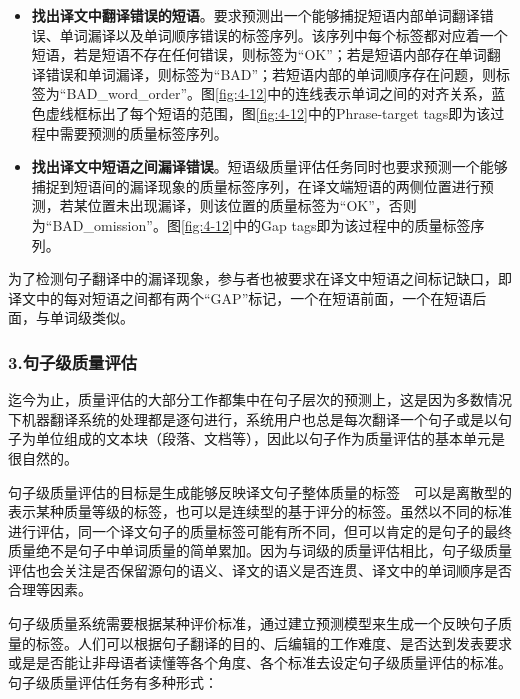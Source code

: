 \begin{itemize}
\vspace{0.5em}
\item {\small\sffamily\bfseries{找出译文中翻译错误的短语}}。要求预测出一个能够捕捉短语内部单词翻译错误、单词漏译以及单词顺序错误的标签序列。该序列中每个标签都对应着一个短语，若是短语不存在任何错误，则标签为“OK”；若是短语内部存在单词翻译错误和单词漏译，则标签为“BAD”；若短语内部的单词顺序存在问题，则标签为“BAD\_word\_order”。图\ref{fig:4-12}中的连线表示单词之间的对齐关系，蓝色虚线框标出了每个短语的范围，图\ref{fig:4-12}中的Phrase-target tags即为该过程中需要预测的质量标签序列。
\vspace{0.5em}
\item {\small\sffamily\bfseries{找出译文中短语之间漏译错误}}。短语级质量评估任务同时也要求预测一个能够捕捉到短语间的漏译现象的质量标签序列，在译文端短语的两侧位置进行预测，若某位置未出现漏译，则该位置的质量标签为“OK”，否则为“BAD\_omission”。图\ref{fig:4-12}中的Gap tags即为该过程中的质量标签序列。
\vspace{0.5em}
\end{itemize}

\parinterval 为了检测句子翻译中的漏译现象，参与者也被要求在译文中短语之间标记缺口，即译文中的每对短语之间都有两个“GAP”标记，一个在短语前面，一个在短语后面，与单词级类似。


\subsubsection{3.句子级质量评估}

\parinterval 迄今为止，质量评估的大部分工作都集中在句子层次的预测上，这是因为多数情况下机器翻译系统的处理都是逐句进行，系统用户也总是每次翻译一个句子或是以句子为单位组成的文本块（段落、文档等），因此以句子作为质量评估的基本单元是很自然的。

\parinterval 句子级质量评估的目标是生成能够反映译文句子整体质量的标签\ \dash \ 可以是离散型的表示某种质量等级的标签，也可以是连续型的基于评分的标签。虽然以不同的标准进行评估，同一个译文句子的质量标签可能有所不同，但可以肯定的是句子的最终质量绝不是句子中单词质量的简单累加。因为与词级的质量评估相比，句子级质量评估也会关注是否保留源句的语义、译文的语义是否连贯、译文中的单词顺序是否合理等因素。

\parinterval 句子级质量系统需要根据某种评价标准，通过建立预测模型来生成一个反映句子质量的标签。人们可以根据句子翻译的目的、后编辑的工作难度、是否达到发表要求或是是否能让非母语者读懂等各个角度、各个标准去设定句子级质量评估的标准。句子级质量评估任务有多种形式：

